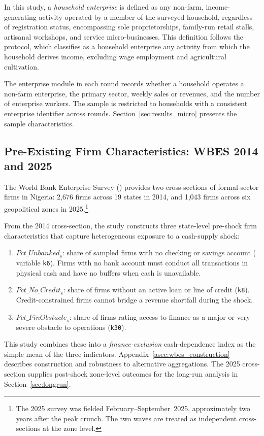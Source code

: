In this study, a \emph{household enterprise} is defined as any non-farm, income-generating
activity operated by a member of the surveyed household, regardless of
registration status, encompassing sole proprietorships, family-run retail
stalls, artisanal workshops, and service micro-businesses. This definition
follows the \NLPS{} protocol, which classifies as a household enterprise any
activity from which the household derives income, excluding wage employment
and agricultural cultivation.

The enterprise module in each round records whether a household operates a
non-farm enterprise, the primary sector, weekly sales or revenues, and the
number of enterprise workers. The sample is restricted to households with a consistent
enterprise identifier across rounds. Section~\ref{sec:results_micro} presents
the sample characteristics.

\subsection{Pre-Existing Firm Characteristics: WBES 2014 and 2025}
\label{sub:wbes}

The World Bank Enterprise Survey (\WBES) provides two cross-sections of
formal-sector firms in Nigeria: 2,676 firms across 19 states in 2014, and
1,043 firms across six geopolitical zones in 2025.\footnote{%
  The 2025 survey was fielded February--September~2025, approximately two
  years after the peak crunch. The two waves are treated as independent
  cross-sections at the zone level.}

From the 2014 cross-section, the study constructs three state-level
pre-shock firm characteristics that capture heterogeneous exposure to a
cash-supply shock:
\begin{enumerate}[noitemsep]
  \item $\textit{Pct\_Unbanked}_s$: share of sampled firms with no checking
    or savings account (\WBES{} variable \texttt{k6}). Firms with no bank
    account must conduct all transactions in physical cash and have no
    buffers when cash is unavailable.
  \item $\textit{Pct\_No\_Credit}_s$: share of firms without an active loan
    or line of credit (\texttt{k8}). Credit-constrained firms cannot bridge
    a revenue shortfall during the shock.
  \item $\textit{Pct\_FinObstacle}_s$: share of firms rating access to
    finance as a major or very severe obstacle to operations (\texttt{k30}).
\end{enumerate}
This study combines these into a \emph{finance-exclusion} cash-dependence index as
the simple mean of the three indicators. Appendix~\ref{asec:wbes_construction}
describes construction and robustness to alternative aggregations.
The 2025 cross-section supplies post-shock zone-level outcomes for the
long-run analysis in Section~\ref{sec:longrun}.

